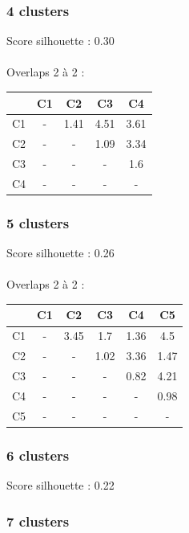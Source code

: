 \documentclass{article}
\begin{document}
\subsubsection*{4 clusters}

\noindent Score silhouette : 0.30 \\\\
Overlaps 2 à 2 :\\

\begin{center}
\begin{tabular}{|c|c|c|c|c|}
\hline
& C1 & C2 & C3 & C4 \\
\hline
C1 & - & 1.41 & 4.51 & 3.61 \\
\hline
C2 & - & - & 1.09 & 3.34 \\
\hline
C3 & - & - & - & 1.6 \\
\hline
C4 & - & - & - & - \\
\hline
\end{tabular} 
\end{center}

\subsubsection*{5 clusters}

\noindent Score silhouette : 0.26 \\\\
Overlaps 2 à 2 :\\

\begin{center}
\begin{tabular}{|c|c|c|c|c|c|}
\hline
& C1 & C2 & C3 & C4 & C5 \\
\hline
C1 & - & 3.45 & 1.7 & 1.36 & 4.5 \\
\hline
C2 & - & - & 1.02 & 3.36 & 1.47 \\
\hline
C3 & - & - & - & 0.82 & 4.21 \\
\hline
C4 & - & - & - & - & 0.98 \\
\hline
C5 & - & - & - & - & - \\
\hline
\end{tabular} 
\end{center}

\subsubsection*{6 clusters}

\noindent Score silhouette : 0.22

\subsubsection*{7 clusters}
\end{document}
